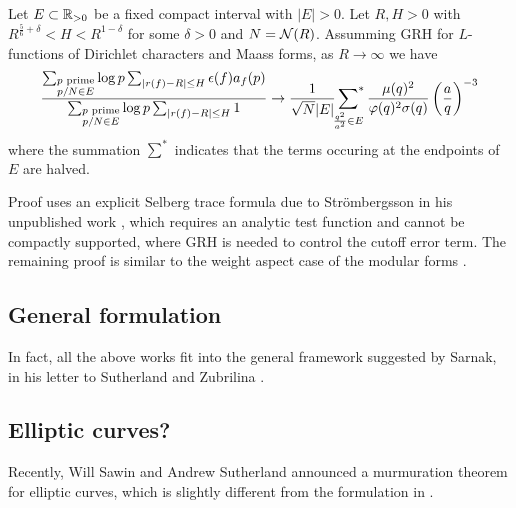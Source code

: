 \begin{theorem}
    Let $E \subset \mathbb{R}_{>0}$ be a fixed compact interval with $|E| > 0$.
    Let $R, H > 0$ with $R^{\frac{5}{6} + \delta} < H < R^{1 - \delta}$ for some $\delta > 0$ and $N = \mathcal{N}(R)$.
    Assumming GRH for $L$-functions of Dirichlet characters and Maass forms, as $R \to \infty$ we have 
    \begin{equation}
        \frac{\sum_{\substack{p\text{ prime} \\ p / N \in E}} \log p \sum_{|r(f) - R| \le H} \epsilon(f) a_{f}(p)}{\sum_{\substack{p\text{ prime} \\ p / N \in E}} \log p \sum_{|r(f) - R| \le H} 1} \to \frac{1}{\sqrt{N}|E|}  \sideset{}{^{*}}\sum_{\frac{q^2}{a^2} \in E}  \frac{\mu(q)^2}{\varphi(q)^2 \sigma(q)} \left(\frac{a}{q}\right)^{-3}
    \end{equation}
    where the summation $\sum^{*}$ indicates that the terms occuring at the endpoints of $E$ are halved. 
\end{theorem}

Proof uses an explicit Selberg trace formula due to Str\"ombergsson in his unpublished work \cite{strombergsson}, which requires an analytic test function and cannot be compactly supported, where GRH is needed to control the cutoff error term.
The remaining proof is similar to the weight aspect case of the modular forms \cite{bober2023murmurations}.

\subsection{General formulation}

In fact, all the above works fit into the general framework suggested by Sarnak, in his letter to Sutherland and Zubrilina \cite{sarnak}.

\subsection{Elliptic curves?}

Recently, Will Sawin and Andrew Sutherland announced a murmuration theorem for elliptic curves, which is slightly different from the formulation in \cite{he2024murmurations}.


